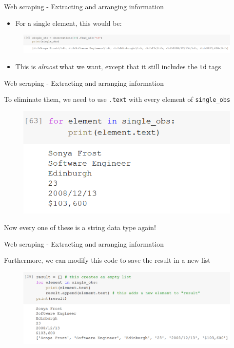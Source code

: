 \documentclass[aspectratio=169]{beamer}
\begin{document}
\begin{frame}{Web scraping - Extracting and arranging information}

	\begin{itemize}
		\item For a single element, this would be:
	\end{itemize}

	\begin{figure}
		\centering
		\includegraphics[width=1.02\linewidth]{img/td_list.png}
	\end{figure}

	\begin{itemize}
		\item This is \textit{almost} what we want, except that it still includes the \texttt{td} tags
	\end{itemize}

\end{frame}

\begin{frame}{Web scraping - Extracting and arranging information}

	To eliminate them, we need to use \texttt{.text} with every element of \texttt{single\_obs}

	\begin{figure}
		\centering
		\includegraphics[width=0.5\linewidth]{img/td_list_text.png}
	\end{figure}

	Now every one of these is a string data type again!

\end{frame}

\begin{frame}{Web scraping - Extracting and arranging information}

	Furthermore, we can modify this code to save the result in a new list

	\begin{figure}
		\centering
		\includegraphics[width=0.9\linewidth]{img/td_new_list_text.png}
	\end{figure}

\end{frame}
\end{document}
